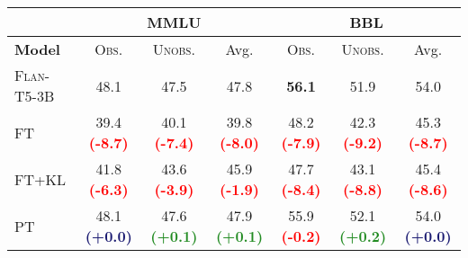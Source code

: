 \begin{table}[h]
  \centering
  \small
  \begin{tabular}{l c c c c c c }
    \toprule
                        & \multicolumn{3}{c}{\textsc{MMLU}}                      & \multicolumn{3}{c}{\textsc{BBL}}                                                                                                                                                                                                                                                           \\ [0.5ex]
    \midrule
    \textbf{Model}      & \textsc{Obs.}                                          & \textsc{Unobs.}                                        & Avg.                                                   & \textsc{Obs.}                                          & \textsc{Unobs.}                                        & Avg.                                                   \\
    \textsc{Flan-T5-3B} & 48.1                                                   & 47.5                                                   & 47.8                                                   & \textbf{56.1}                                          & 51.9                                                   & 54.0                                                   \\
    FT                  & 39.4 \textcolor{red}{\textbf{(-8.7)}}                  & 40.1 \textcolor{red}{\textbf{(-7.4)}}                  & 39.8 \textcolor{red}{\textbf{(-8.0)}}                  & 48.2 \textcolor{red}{\textbf{(-7.9)}}                  & 42.3 \textcolor{red}{\textbf{(-9.2)}}                  & 45.3 \textcolor{red}{\textbf{(-8.7)}}                  \\
    FT+KL               & 41.8 \textcolor{red}{\textbf{(-6.3)}}                  & 43.6 \textcolor{red}{\textbf{(-3.9)}}                  & 45.9 \textcolor{red}{\textbf{(-1.9)}}                  & 47.7 \textcolor{red}{\textbf{(-8.4)}}                  & 43.1 \textcolor{red}{\textbf{(-8.8)}}                  & 45.4 \textcolor{red}{\textbf{(-8.6)}}                  \\
    PT                  & 48.1 \textcolor{MidnightBlue}{\textbf{(+0.0)}}         & 47.6 \textcolor{ForestGreen}{\textbf{(+0.1)}}          & 47.9 \textcolor{ForestGreen}{\textbf{(+0.1)}}          & 55.9 \textcolor{red}{\textbf{(-0.2)}}                  & 52.1 \textcolor{ForestGreen}{\textbf{(+0.2)}}          & 54.0 \textcolor{MidnightBlue}{\textbf{(+0.0)}}         \\

\end{tabular}
\end{table}
